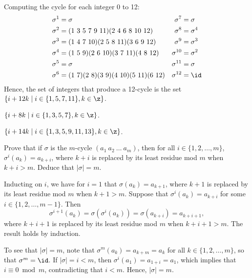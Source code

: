 \begin{solalph}
    \item Computing the cycle for each integer 0 to 12:
    \begin{align*}
        \sigma^1 & = \sigma & \sigma^7 & = \sigma \\
        \sigma^2 & = (1\ 3\ 5\ 7\ 9\ 11)(2\ 4\ 6\ 8\ 10\ 12) & \sigma^8 & = \sigma^4 \\
        \sigma^3 & = (1\ 4\ 7\ 10)(2\ 5\ 8\ 11)(3\ 6\ 9\ 12) & \sigma^9 & = \sigma^3 \\
        \sigma^4 & = (1\ 5\ 9)(2\ 6\ 10)(3\ 7\ 11)(4\ 8\ 12) & \sigma^{10} & = \sigma^2 \\
        \sigma^5 & = \sigma & \sigma^{11} & = \sigma \\
        \sigma^6 & = (1\ 7)(2\ 8)(3\ 9)(4\ 10)(5\ 11)(6\ 12) & \sigma^{12} & = \id
    \end{align*}
    Hence, the set of integers that produce a 12-cycle is the set $\{i + 12k \mid i \in \{1, 5, 7, 11\}, k \in \z\}$.
    \item $\{i + 8k \mid i \in \{1, 3, 5, 7\}, k \in \z\}$.
    \item $\{i + 14k \mid i \in \{1, 3, 5, 9, 11, 13\}, k \in \z\}$. \qh
\end{solalph}

\begin{exercise} \label{ex1.3.10}
    Prove that if $\sigma$ is the $m$-cycle $(a_1\ a_2\ \dots\ a_m)$, then for all $i \in \{1,2,\dots,m\}$, $\sigma^i(a_k) = a_{k+i}$, where $k+i$ is replaced by its least residue mod $m$ when $k+i > m$. Deduce that $|\sigma| = m$.
\end{exercise}

\begin{sol}
    Inducting on $i$, we have for $i = 1$ that $\sigma(a_k) = a_{k+1}$, where $k+1$ is replaced by its least residue mod $m$ when $k+1 > m$. Suppose that $\sigma^i(a_k) = a_{k+i}$ for some $i \in \{1,2,\dots,m-1\}$. Then
    \[\sigma^{i+1}(a_k) = \sigma(\sigma^i(a_k)) = \sigma(a_{k+i}) = a_{k+i+1},\]
    where $k+i+1$ is replaced by its least residue mod $m$ when $k+i+1 > m$. The result holds by induction.

    To see that $|\sigma| = m$, note that $\sigma^m(a_k) = a_{k+m} = a_k$ for all $k \in \{1,2,\dots,m\}$, so that $\sigma^m = \id$. If $|\sigma| = i < m$, then $\sigma^i(a_1) = a_{1+i} = a_1$, which implies that $i \equiv 0 \bmod m$, contradicting that $i < m$. Hence, $|\sigma| = m$.
\end{sol}

